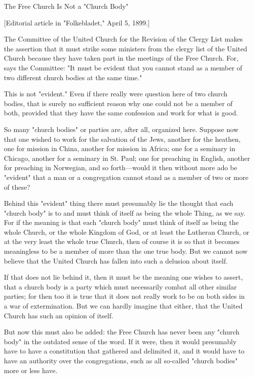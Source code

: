 
The Free Church Is Not a "Church Body"

[Editorial article in "Folkebladet," April 5, 1899.]

The Committee of the United Church for the Revision of the Clergy List makes the assertion that it must strike some ministers from the clergy list of the United Church because they have taken part in the meetings of the Free Church. For, says the Committee: "It must be evident that you cannot stand as a member of two different church bodies at the same time."

This is not "evident." Even if there really were question here of two church bodies, that is surely no sufficient reason why one could not be a member of both, provided that they have the same confession and work for what is good.

So many "church bodies" or parties are, after all, organized here. Suppose now that one wished to work for the salvation of the Jews, another for the heathen, one for mission in China, another for mission in Africa; one for a seminary in Chicago, another for a seminary in St. Paul; one for preaching in English, another for preaching in Norwegian, and so forth—would it then without more ado be "evident" that a man or a congregation cannot stand as a member of two or more of these?

Behind this "evident" thing there must presumably lie the thought that each "church body" is to and must think of itself as being the whole Thing, as we say. For if the meaning is that each "church body" must think of itself as being the whole Church, or the whole Kingdom of God, or at least the Lutheran Church, or at the very least the whole true Church, then of course it is so that it becomes meaningless to be a member of more than the one true body. But we cannot now believe that the United Church has fallen into such a delusion about itself.

If that does not lie behind it, then it must be the meaning one wishes to assert, that a church body is a party which must necessarily combat all other similar parties; for then too it is true that it does not really work to be on both sides in a war of extermination. But we can hardly imagine that either, that the United Church has such an opinion of itself.

But now this must also be added: the Free Church has never been any "church body" in the outdated sense of the word. If it were, then it would presumably have to have a constitution that gathered and delimited it, and it would have to have an authority over the congregations, such as all so-called "church bodies" more or less have.


